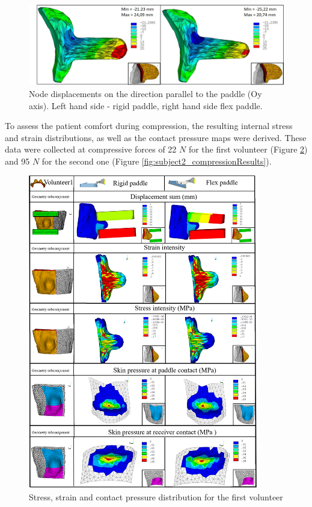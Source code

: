 \begin{figure}[!h]
\centering
\includegraphics[width=1\textwidth,keepaspectratio]{figures/rigid_flex_y_displacement.jpg} 
\caption{Node displacements on the direction parallel to the paddle (Oy axis). Left hand side - rigid paddle, right hand side flex paddle.}\label{fig:rigid_flex_y_displacement}
\end{figure}

To assess the patient comfort during compression, the resulting internal stress and strain distributions, as well as the contact pressure maps were derived. These data were collected at compressive forces of 22 $N$ for the first volunteer (Figure \ref{fig:subject1_compressionResults}) and 95 $N$ for the second one (Figure \ref{fig:subject2_compressionResults}).

\begin{figure}[h!]
\centering
\includegraphics[width=0.9\textwidth,keepaspectratio]{figures/subject1_compressionResults.png} 
\caption{Stress, strain and contact pressure distribution for the first volunteer}\label{fig:subject1_compressionResults}
\end{figure}

